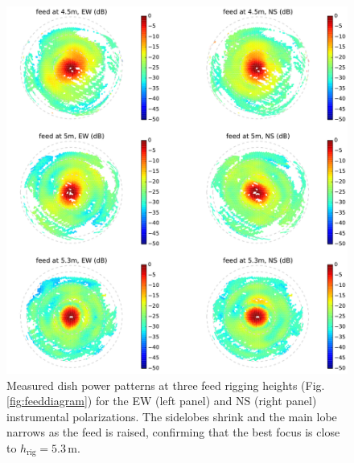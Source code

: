 \documentclass{emulateapj}
\begin{document}
\begin{figure}[t]
\centering
\includegraphics[width=6.5in]{measured_beams_and_models_maps.pdf}
\caption{Measured dish power patterns at three feed rigging heights (Fig. \ref{fig:feeddiagram}) for the EW (left panel) and NS (right panel) instrumental polarizations. The sidelobes shrink and the main lobe narrows as the feed is raised, confirming that the best focus is close to $h_\text{rig}=5.3$\,m.}
\label{fig:measuredbeammaps}
\end{figure}
\end{document}
